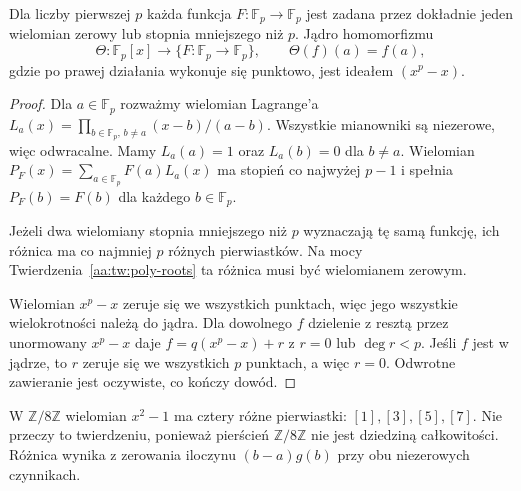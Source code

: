 \begin{twierdzenie}
\label{aa:tw:finite-field-polynomial-functions}
Dla liczby pierwszej $p$ każda funkcja
$F:\mathbb F_p\to\mathbb F_p$ jest zadana przez
dokładnie jeden wielomian zerowy lub stopnia mniejszego niż $p$.
Jądro homomorfizmu
\[
 \Theta:\mathbb F_p[x]\longrightarrow
 \{F:\mathbb F_p\to\mathbb F_p\},\qquad
 \Theta(f)(a)=f(a),
\]
gdzie po prawej działania wykonuje się punktowo,
jest ideałem $(x^p-x)$.
\end{twierdzenie}
\begin{proof}
Dla $a\in\mathbb F_p$ rozważmy wielomian Lagrange'a
$L_a(x)=\prod_{b\in\mathbb F_p,\,b\ne a}
 (x-b)/(a-b)$. Wszystkie mianowniki są niezerowe,
więc odwracalne. Mamy $L_a(a)=1$ oraz $L_a(b)=0$
dla $b\ne a$. Wielomian
$P_F(x)=\sum_{a\in\mathbb F_p}F(a)L_a(x)$
ma stopień co najwyżej $p-1$ i spełnia
$P_F(b)=F(b)$ dla każdego $b\in\mathbb F_p$.

Jeżeli dwa wielomiany stopnia mniejszego niż $p$
wyznaczają tę samą funkcję, ich różnica ma co najmniej
$p$ różnych pierwiastków. Na mocy
Twierdzenia~\ref{aa:tw:poly-roots} ta różnica musi być
wielomianem zerowym.

Wielomian $x^p-x$ zeruje się we wszystkich punktach,
więc jego wszystkie wielokrotności należą do jądra.
Dla dowolnego $f$ dzielenie z resztą przez unormowany
$x^p-x$ daje $f=q(x^p-x)+r$ z $r=0$ lub
$\deg r<p$. Jeśli $f$ jest w jądrze, to $r$
zeruje się we wszystkich $p$ punktach, a więc $r=0$.
Odwrotne zawieranie jest oczywiste, co kończy dowód.
\end{proof}

\begin{przyklad}
\label{aa:prz:poly-roots-z8}
W $\mathbb Z/8\mathbb Z$ wielomian $x^2-1$
ma cztery różne pierwiastki: $[1],[3],[5],[7]$.
Nie przeczy to twierdzeniu, ponieważ pierścień
$\mathbb Z/8\mathbb Z$ nie jest dziedziną całkowitości.
Różnica wynika z zerowania iloczynu $(b-a)g(b)$
przy obu niezerowych czynnikach.
\end{przyklad}

